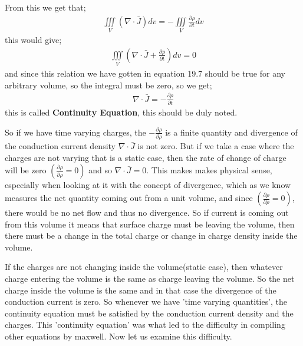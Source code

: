 From this we get that;
\begin{align*}
\iiint\limits_V(\nabla\cdot\bar{J})dv = -\iiint\limits_V\frac{\partial\rho}{\partial t}dv
\end{align*}
this would give;
\begin{align*}
\iiint\limits_V(\nabla\cdot\bar{J} + \frac{\partial\rho}{\partial t} )dv = 0
\end{align*}
and since this relation we have gotten in equation 19.7 should be true for any arbitrary volume, so the integral must be zero, so we get;
\begin{align}
\nabla\cdot\bar{J} = -\frac{\partial\rho}{\partial t}
\end{align}
this is called \textbf{Continuity Equation}, this should be duly noted.

So if we have time varying charges, the $-\frac{\partial\rho}{\partial\rho}$ is a finite quantity and divergence of the conduction current density $\nabla\cdot\bar{J}$ is not zero. But if we take a case where the charges are not varying that is a static case, then the rate of change of charge will be zero $(\frac{\partial\rho}{\partial\rho}=0)$ and so $\nabla\cdot\bar{J}=0$. This makes makes physical sense, especially when looking at it with the concept of divergence, which as we know measures the net quantity coming out from a unit volume, and since $(\frac{\partial\rho}{\partial\rho}=0)$, there would be no net flow and thus no divergence. So if current is coming out from this volume it means that surface charge must be leaving the volume, then there must be a change in the total charge or change in charge density inside the volume.

If the charges are not changing inside the volume(static case), then whatever charge entering the volume is the same as charge leaving the volume. So the net charge inside the volume is the same and in that case the divergence of the conduction current is zero. So whenever we have 'time varying quantities', the continuity equation must be satisfied by the conduction current density and the charges. This 'continuity equation' was what led to the difficulty in compiling other equations by maxwell. Now let us examine this difficulty.

